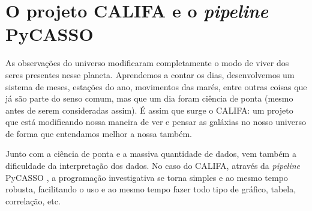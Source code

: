 


\chapter{O projeto CALIFA e o {\em pipeline} PyCASSO}
\label{sec:CALePyC}

As observações do universo modificaram completamente o modo de viver dos seres
presentes nesse planeta. Aprendemos a contar os dias, desenvolvemos um sistema
de meses, estações do ano, movimentos das marés, entre outras coisas que já são
parte do senso comum, mas que um dia foram ciência de ponta (mesmo antes de
serem consideradas assim). É assim que surge o CALIFA: um projeto que está
modificando nossa maneira de ver e pensar as galáxias no nosso universo de
forma que entendamos melhor a nossa também.

Junto com a ciência de ponta e a massiva quantidade de dados, vem também a
dificuldade da interpretação dos dados. No caso do CALIFA, através da {\em
pipeline} PyCASSO \citep{CidFernandes2013a}, a programação investigativa se
torna simples e ao mesmo tempo robusta, facilitando o uso e ao mesmo tempo fazer
todo tipo de gráfico, tabela, correlação, etc.


